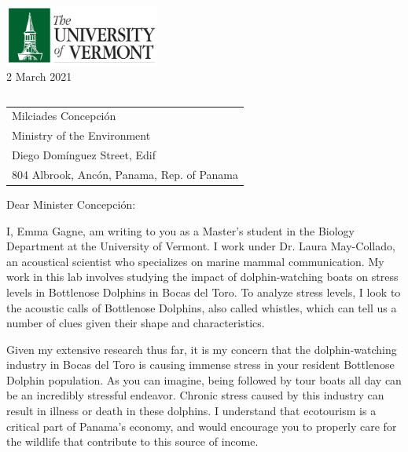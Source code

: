 \documentclass[10pt]{article}\usepackage[]{graphicx}\usepackage[]{color}
\begin{document}
\raggedright %
\includegraphics[scale=0.15,width=2in]{UVMLogo.jpg}\\ 

 \hfill\hfill\hfill %
 2 March 2021\\[10pt]  %
 
\begin{tabular}{l@{}}
\end{tabular}

\begin{tabular}{@{}l}
Milciades Concepción\\
Ministry of the Environment\\
Diego Domínguez Street, Edif\\
804 Albrook, Ancón, Panama, Rep. of Panama
\end{tabular}


Dear Minister Concepción:

I, Emma Gagne, am writing to you as a Master's student in the Biology Department at the University of Vermont. I work under Dr. Laura May-Collado, an acoustical scientist who specializes on marine mammal communication. My work in this lab involves studying the impact of dolphin-watching boats on stress levels in Bottlenose Dolphins in Bocas del Toro. To analyze stress levels, I look to the acoustic calls of Bottlenose Dolphins, also called whistles, which can tell us a number of clues given their shape and characteristics. 

Given my extensive research thus far, it is my concern that the dolphin-watching industry in Bocas del Toro is causing immense stress in your resident Bottlenose Dolphin population. As you can imagine, being followed by tour boats all day can be an incredibly stressful endeavor. Chronic stress caused by this industry can result in illness or death in these dolphins. I understand that ecotourism is a critical part of Panama's economy, and would encourage you to properly care for the wildlife that contribute to this source of income.
\end{document}
